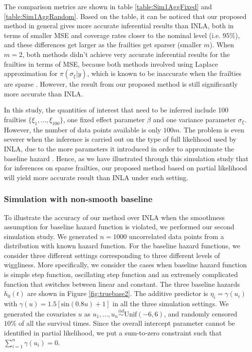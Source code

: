 \documentclass[ba]{imsart}
\begin{document}
The comparison metrics are shown in table \ref{table:Sim1AggFixed} and \ref{table:Sim1AggRandom}. Based on the table, it can be noticed that our proposed method in general gives more accurate inferential results than INLA, both in terms of smaller MSE and coverage rates closer to the nominal level (i.e. $95\%$), and these differences get larger as the frailties get sparser (smaller $m$). When $m = 2$, both methods didn't achieve very accurate inferential results for the frailties in terms of MSE, because both methods involved using Laplace approximation for $\pi(\sigma_\xi|y)$, which is known to be inaccurate when the frailties are sparse \citep{Ogden2013ASR}. However, the result from our proposed method is still significantly more accurate than INLA.

In this study, the quantities of interest that need to be inferred include 100 frailties $\{\xi_1,...,\xi_{100}\}$, one fixed effect parameter $\beta$ and one variance parameter $\sigma_\xi$. However, the number of data points available is only $100m$. The problem is even severer when the inference is carried out on the type of full likelihood used by INLA, due to the more parameters it introduced in order to approximate the baseline hazard \citep{coxdiscussion}. Hence, as we have illustrated through this simulation study that for inferences on sparse frailties, our proposed method based on partial likelihood will yield more accurate result than INLA under such setting.

\subsubsection{Simulation with non-smooth baseline}\label{subsubsec:sim2}

To illustrate the accuracy of our method over INLA when the smoothness assumption for baseline hazard function is violated, we performed our second simulation study. We generated $n = 1000$ uncorrelated data points from a distribution with known hazard function. For the baseline hazard functions, we consider three different settings corresponding to three different levels of wiggliness. More specifically, we consider the cases when baseline hazard function is simple step function, oscillating step function and an extremely complicated function that switches between linear and constant. The three baseline hazards $h_{0}(t)$ are shown in Figure \ref{fig:truebase2}. The additive predictor is $\eta_{i} = \gamma\left(u_{i}\right)$ with $\gamma(u) = 1.5 [ \text{sin}(0.8u) + 1 ]$ in all the three simulation settings. We generated the covariates $u$ as  $u_{1},\ldots,u_{n}\overset{iid}{\sim}\text{Unif}(-6,6)$, and randomly censored $10\%$ of all the survival times. Since the overall intercept parameter cannot be identified in partial likelihood, we put a sum-to-zero constraint such that $\sum_{i=1}^{n} \gamma{(u_i)} = 0$.
\end{document}
